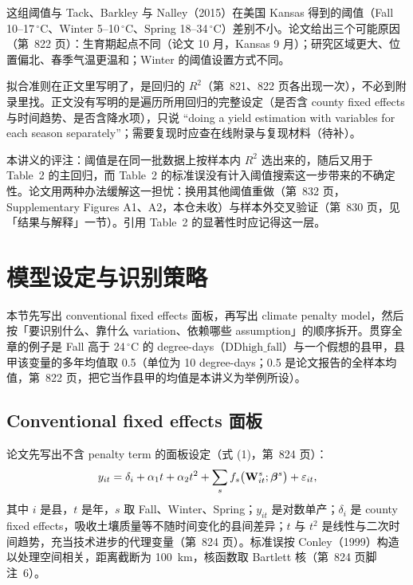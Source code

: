这组阈值与 Tack、Barkley 与 Nalley（2015）在美国 Kansas 得到的阈值（Fall 10--17\,$^\circ$C、Winter 5--10\,$^\circ$C、Spring 18--34\,$^\circ$C）差别不小。论文给出三个可能原因（第~822 页）：生育期起点不同（论文 10 月，Kansas 9 月）；研究区域更大、位置偏北、春季气温更温和；Winter 的阈值设置方式不同。

\begin{pitfall}
拟合准则在正文里写明了，是回归的 $R^2$（第~821、822 页各出现一次），不必到附录里找。正文没有写明的是遍历所用回归的完整设定（是否含 county fixed effects 与时间趋势、是否含降水项），只说 ``doing a yield estimation with variables for each season separately''\citep[第~822 页]{da2024climate}；需要复现时应查在线附录与复现材料（待补）。

本讲义的评注：阈值是在同一批数据上按样本内 $R^2$ 选出来的，随后又用于 Table~2 的主回归，而 Table~2 的标准误没有计入阈值搜索这一步带来的不确定性。论文用两种办法缓解这一担忧：换用其他阈值重做（第~832 页，Supplementary Figures A1、A2，本仓未收）与样本外交叉验证（第~830 页，见「结果与解释」一节）。引用 Table~2 的显著性时应记得这一层。
\end{pitfall}

\section{模型设定与识别策略}

本节先写出 conventional fixed effects 面板，再写出 climate penalty model，然后按「要识别什么、靠什么 variation、依赖哪些 assumption」的顺序拆开。贯穿全章的例子是 Fall 高于 24\,$^\circ$C 的 degree-days（$\mathrm{DDhigh\_fall}$）与一个假想的县甲，县甲该变量的多年均值取 0.5（单位为 10 degree-days；0.5 是论文报告的全样本均值，第~822 页，把它当作县甲的均值是本讲义为举例所设）。

\subsection{Conventional fixed effects 面板}

论文先写出不含 penalty term 的面板设定（式 (1)，第~824 页）：
\begin{equation}
y_{it} = \delta_i + \alpha_1 t + \alpha_2 t^2 + \sum_{s} f_s\bigl(\mathbf{W}^s_{it};\boldsymbol{\beta}^s\bigr) + \varepsilon_{it},
\label{eq:da-fe}
\end{equation}
其中 $i$ 是县，$t$ 是年，$s$ 取 Fall、Winter、Spring；$y_{it}$ 是对数单产；$\delta_i$ 是 county fixed effects，吸收土壤质量等不随时间变化的县间差异；$t$ 与 $t^2$ 是线性与二次时间趋势，充当技术进步的代理变量（第~824 页）。标准误按 Conley（1999）构造以处理空间相关，距离截断为 100~km，核函数取 Bartlett 核（第~824 页脚注~6）。

